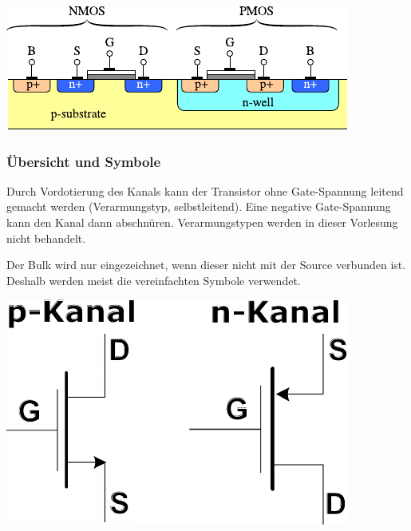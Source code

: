 \vspace{-0.2cm}

\begin{center}
    \includegraphics[width=0.5\columnwidth, align=t]{images/01_CMOS.pdf}
\end{center}


\subsubsection{Übersicht und Symbole}

\begin{minipage}[t]{0.48\columnwidth}
    Durch Vordotierung des Kanals kann der Transistor ohne Gate-Spannung leitend gemacht werden (Verarmungstyp, selbstleitend).
    Eine negative Gate-Spannung kann den Kanal dann abschnüren. Verarmungstypen werden in dieser Vorlesung nicht behandelt.

    \smallskip

    Der Bulk wird nur eingezeichnet, wenn dieser nicht mit der Source verbunden ist.
    Deshalb werden meist die vereinfachten Symbole verwendet.

    \vspace{-0.3cm}

    \begin{center}
        \includegraphics[width=0.45\columnwidth, align=t]{images/MOSFET_symbole_vereinfacht.pdf}
    \end{center}
\end{minipage}
\hfill
